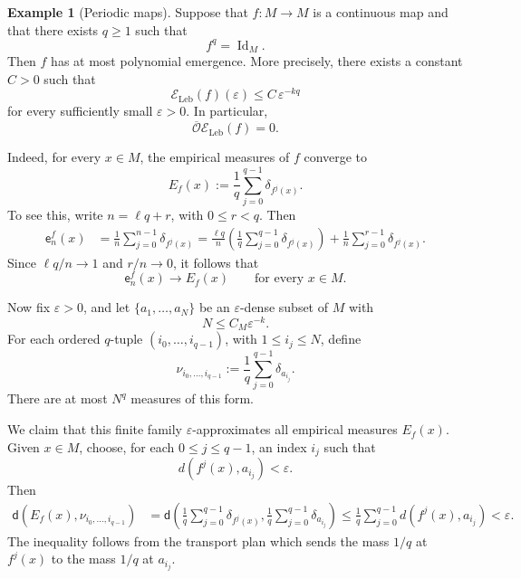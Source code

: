 \documentclass[11pt,reqno]{amsart}
\theoremstyle{plain}
\theoremstyle{definition}
\newtheorem{example}[theorem]{Example}
\theoremstyle{remark}
\theoremstyle{plain}
\numberwithin{equation}{section}
\newcommand{\Id}{\operatorname{Id}}
\begin{document}
\begin{example}[Periodic maps]\label{ex:periodic-systems}
Suppose that $f:M\to M$ is a continuous map and that there exists $q\geq 1$
such that
\begin{equation*}
f^q=\Id_M.
\end{equation*}
Then $f$ has at most polynomial emergence. More precisely, there exists a
constant $C>0$ such that
\begin{equation*}
\mathcal E_{\mathrm{Leb}}(f)(\varepsilon)
\leq C\,\varepsilon^{-kq}
\end{equation*}
for every sufficiently small $\varepsilon>0$. In particular,
\begin{equation*}
\overline{\mathcal O}\mathcal E_{\mathrm{Leb}}(f)=0.
\end{equation*}

Indeed, for every $x\in M$, the empirical measures of $f$ converge to
\begin{equation*}
E_f(x)
:=
\frac1q\sum_{j=0}^{q-1}\delta_{f^j(x)}.
\end{equation*}
To see this, write $n=\ell q+r$, with $0\leq r<q$. Then
\begin{align*}
\mathsf e_n^f(x)
&=
\frac1n\sum_{j=0}^{n-1}\delta_{f^j(x)} 
=\frac{\ell q}{n}
\left(
\frac1q\sum_{j=0}^{q-1}\delta_{f^j(x)}
\right)
+
\frac1n\sum_{j=0}^{r-1}\delta_{f^j(x)}.
\end{align*}
Since $\ell q/n\to 1$ and $r/n\to 0$, it follows that
\begin{equation*}
\mathsf e_n^f(x)\longrightarrow E_f(x)
\qquad\text{for every }x\in M.
\end{equation*}

Now fix $\varepsilon>0$, and let $\{a_1,\dots,a_N\}$ be an $\varepsilon$-dense
subset of $M$ with
\begin{equation*}
N\leq C_M\varepsilon^{-k}.
\end{equation*}
For each ordered $q$-tuple $(i_0,\dots,i_{q-1})$, with
$1\leq i_j\leq N$, define
\begin{equation*}
\nu_{i_0,\dots,i_{q-1}}
:=
\frac1q\sum_{j=0}^{q-1}\delta_{a_{i_j}}.
\end{equation*}
There are at most $N^q$ measures of this form.

We claim that this finite family $\varepsilon$-approximates all empirical
measures $E_f(x)$. Given $x\in M$, choose, for each $0\leq j\leq q-1$, an
index $i_j$ such that
\begin{equation*}
d(f^j(x),a_{i_j})<\varepsilon.
\end{equation*}
Then
\begin{align*}
\mathsf d\left(
E_f(x),
\nu_{i_0,\dots,i_{q-1}}
\right)
&=
\mathsf d\left(
\frac1q\sum_{j=0}^{q-1}\delta_{f^j(x)},
\frac1q\sum_{j=0}^{q-1}\delta_{a_{i_j}}
\right) \leq
\frac1q\sum_{j=0}^{q-1}
d(f^j(x),a_{i_j}) <\varepsilon.
\end{align*}
The inequality follows from the transport plan which sends the mass $1/q$ at
$f^j(x)$ to the mass $1/q$ at $a_{i_j}$.


\end{example}
\end{document}
